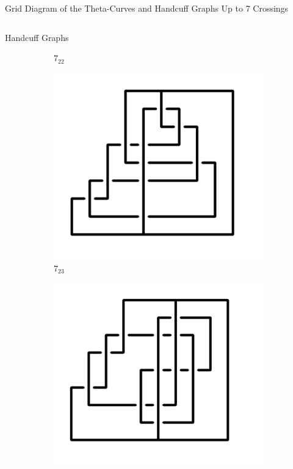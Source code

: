 \documentclass[final]{beamer}
\begin{document}
\begin{frame}[t]
\begin{alertblock}{Grid Diagram of the Theta-Curves and Handcuff Graphs Up to 7 Crossings}
\begin{columns}[t]
\begin{column}{0.5\textwidth}
\begin{alertblock}{Handcuff Graphs}
\begin{figure}
\begin{subfigure}{0.075\textwidth}
    \caption{$7_{22}$} 
    \end{subfigure}
    \begin{subfigure}{0.075\textwidth}
    \includegraphics[width=\columnwidth]{../Midterm_Poster/grid_diagram/handcuff_7_23.png}
    \caption{$7_{23}$} 
    \end{subfigure}
    \begin{subfigure}{0.075\textwidth}
    \includegraphics[width=\columnwidth]{../Midterm_Poster/grid_diagram/handcuff_7_24.png}

\end{subfigure}
\end{figure}
\end{alertblock}
\end{column}
\end{columns}
\end{alertblock}
\end{frame}
\end{document}
